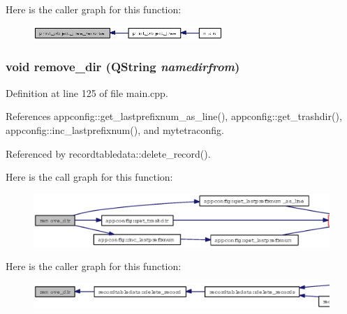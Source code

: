 Here is the caller graph for this function:\begin{figure}[H]
\begin{center}
\leavevmode
\includegraphics[width=203pt]{main_8cpp_571c71b2c6270a13685be239f6f91311_icgraph}
\end{center}
\end{figure}
\subsubsection{\setlength{\rightskip}{0pt plus 5cm}void remove\_\-dir (QString {\em namedirfrom})}\label{main_8cpp_6ac3f8d337a3e659a3c1cdfeef1cbaf0}




Definition at line 125 of file main.cpp.

References appconfig::get\_\-lastprefixnum\_\-as\_\-line(), appconfig::get\_\-trashdir(), appconfig::inc\_\-lastprefixnum(), and mytetraconfig.

Referenced by recordtabledata::delete\_\-record().

Here is the call graph for this function:\begin{figure}[H]
\begin{center}
\leavevmode
\includegraphics[width=373pt]{main_8cpp_6ac3f8d337a3e659a3c1cdfeef1cbaf0_cgraph}
\end{center}
\end{figure}


Here is the caller graph for this function:\begin{figure}[H]
\begin{center}
\leavevmode
\includegraphics[width=384pt]{main_8cpp_6ac3f8d337a3e659a3c1cdfeef1cbaf0_icgraph}
\end{center}
\end{figure}
